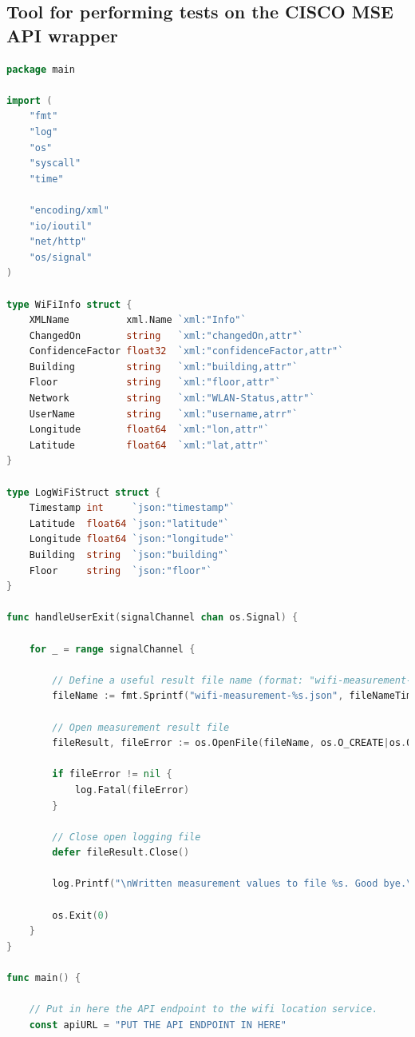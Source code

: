 \documentclass[twoside,11pt,titlepage,a4paper,english,bibliography=totocnumbered,listof=numbered]{scrbook}
\begin{document}
\begin{appendices}

\section{Tool for performing tests on the CISCO MSE API wrapper}
\label{appendix:cisco-mse-api-test}

\begin{lstlisting}[language=go]
package main

import (
    "fmt"
    "log"
    "os"
    "syscall"
    "time"

    "encoding/xml"
    "io/ioutil"
    "net/http"
    "os/signal"
)

type WiFiInfo struct {
    XMLName          xml.Name `xml:"Info"`
    ChangedOn        string   `xml:"changedOn,attr"`
    ConfidenceFactor float32  `xml:"confidenceFactor,attr"`
    Building         string   `xml:"building,attr"`
    Floor            string   `xml:"floor,attr"`
    Network          string   `xml:"WLAN-Status,attr"`
    UserName         string   `xml:"username,atrr"`
    Longitude        float64  `xml:"lon,attr"`
    Latitude         float64  `xml:"lat,attr"`
}

type LogWiFiStruct struct {
    Timestamp int     `json:"timestamp"`
    Latitude  float64 `json:"latitude"`
    Longitude float64 `json:"longitude"`
    Building  string  `json:"building"`
    Floor     string  `json:"floor"`
}

func handleUserExit(signalChannel chan os.Signal) {

    for _ = range signalChannel {

        // Define a useful result file name (format: "wifi-measurement-year-month-day-hour-minute-seconds.json")
        fileName := fmt.Sprintf("wifi-measurement-%s.json", fileNameTime)

        // Open measurement result file
        fileResult, fileError := os.OpenFile(fileName, os.O_CREATE|os.O_RDWR|os.O_APPEND, 0666)

        if fileError != nil {
            log.Fatal(fileError)
        }

        // Close open logging file
        defer fileResult.Close()

        log.Printf("\nWritten measurement values to file %s. Good bye.\n", fileName)

        os.Exit(0)
    }
}

func main() {

    // Put in here the API endpoint to the wifi location service.
    const apiURL = "PUT THE API ENDPOINT IN HERE"


\end{lstlisting}
\end{appendices}
\end{document}
